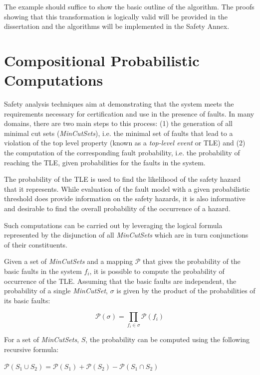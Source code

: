 The example should suffice to show the basic outline of the algorithm. The proofs showing that this transformation is logically valid will be provided in the dissertation and the algorithms will be implemented in the Safety Annex.  


\section{Compositional Probabilistic Computations}
Safety analysis techniques aim at demonstrating that the system meets the requirements necessary for certification and use in the presence of faults. In many domains, there are two main steps to this process: (1) the generation of all minimal cut sets (\textit{MinCutSets}), i.e. the minimal set of faults that lead to a violation of the top level property (known as a \textit{top-level event} or TLE) and (2) the computation of the corresponding fault probability, i.e. the probability of reaching the TLE, given probabilities for the faults in the system. 

The probability of the TLE is used to find the likelihood of the safety hazard that it represents. While evaluation of the fault model with a given probabilistic threshold does provide information on the safety hazards, it is also informative and desirable to find the overall probability of the occurrence of a hazard. 

Such computations can be carried out by leveraging the logical formula represented by the disjunction of all \textit{MinCutSets} which are in turn conjunctions of their constituents. 

Given a set of \textit{MinCutSets} and a mapping $\mathcal{P}$ that gives the probability of the basic faults in the system $f_i$, it is possible to compute the probability of occurrence of the TLE. Assuming that the basic faults are independent, the probability of a single \textit{MinCutSet}, $\sigma$ is given by the product of the probabilities of its basic faults:
\begin{center}
    \begin{equation*}\mathcal{P}(\sigma) = \prod_{f_i \in \sigma} \mathcal{P}(f_i) 
    \end{equation*}    
\end{center}

For a set of \textit{MinCutSets}, $S$, the probability can be computed using the following recursive formula:

\begin{center}
    $\mathcal{P}(S_1 \cup S_2) = \mathcal{P}(S_1) + \mathcal{P}(S_2) - \mathcal{P}(S_1 \cap S_2)$
\end{center}

